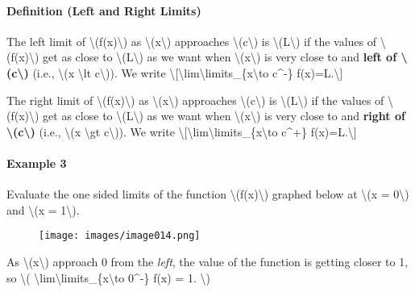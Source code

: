 \hypertarget{definition-left-and-right-limits}{%
\paragraph{Definition (Left and Right
Limits)}\label{definition-left-and-right-limits}}

The left limit of \textbackslash{}(f(x)\textbackslash{}) as
\textbackslash{}(x\textbackslash{}) approaches
\textbackslash{}(c\textbackslash{}) is
\textbackslash{}(L\textbackslash{}) if the values of
\textbackslash{}(f(x)\textbackslash{}) get as close to
\textbackslash{}(L\textbackslash{}) as we want when
\textbackslash{}(x\textbackslash{}) is very close to and \textbf{left of
\textbackslash{}(c\textbackslash{})} (i.e., \textbackslash{}(x
\textbackslash{}lt c\textbackslash{})). We write
\textbackslash{}{[}\textbackslash{}lim\textbackslash{}limits\_\{x\textbackslash{}to
c\^{}-\} f(x)=L.\textbackslash{}{]}

The right limit of \textbackslash{}(f(x)\textbackslash{}) as
\textbackslash{}(x\textbackslash{}) approaches
\textbackslash{}(c\textbackslash{}) is
\textbackslash{}(L\textbackslash{}) if the values of
\textbackslash{}(f(x)\textbackslash{}) get as close to
\textbackslash{}(L\textbackslash{}) as we want when
\textbackslash{}(x\textbackslash{}) is very close to and \textbf{right
of \textbackslash{}(c\textbackslash{})} (i.e., \textbackslash{}(x
\textbackslash{}gt c\textbackslash{})). We write
\textbackslash{}{[}\textbackslash{}lim\textbackslash{}limits\_\{x\textbackslash{}to
c\^{}+\} f(x)=L.\textbackslash{}{]}

\hypertarget{example-3}{%
\paragraph{Example 3}\label{example-3}}

Evaluate the one sided limits of the function
\textbackslash{}(f(x)\textbackslash{}) graphed below at
\textbackslash{}(x = 0\textbackslash{}) and \textbackslash{}(x =
1\textbackslash{}).

\begin{figure}
\centering
\texttt{[image: images/image014.png]}
\caption{}
\end{figure}

As \textbackslash{}(x\textbackslash{}) approach 0 from the \emph{left},
the value of the function is getting closer to 1, so \textbackslash{}(
\textbackslash{}lim\textbackslash{}limits\_\{x\textbackslash{}to
0\^{}-\} f(x) = 1. \textbackslash{})

